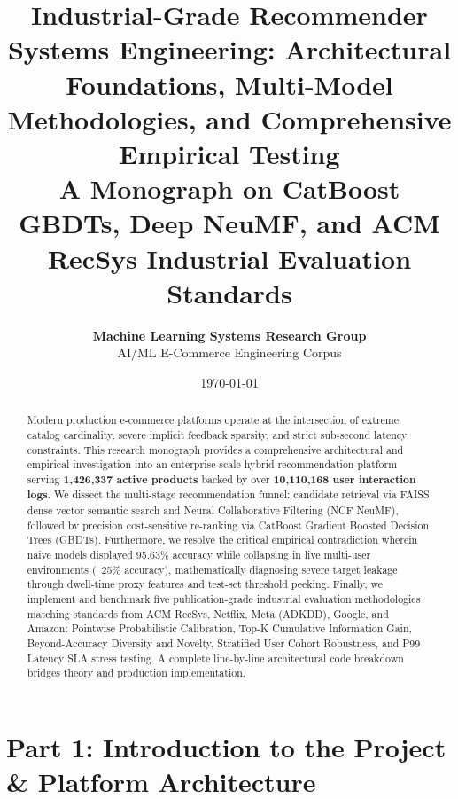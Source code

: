 \documentclass[11pt,a4paper]{article}
\title{\textbf{\Large Industrial-Grade Recommender Systems Engineering: Architectural Foundations, Multi-Model Methodologies, and Comprehensive Empirical Testing}\\[0.4em]
\large A Monograph on CatBoost GBDTs, Deep NeuMF, and ACM RecSys Industrial Evaluation Standards}
\author{\textbf{Machine Learning Systems Research Group} \\ AI/ML E-Commerce Engineering Corpus}
\date{\today}
\begin{document}
\maketitle

\begin{abstract}
Modern production e-commerce platforms operate at the intersection of extreme catalog cardinality, severe implicit feedback sparsity, and strict sub-second latency constraints. This research monograph provides a comprehensive architectural and empirical investigation into an enterprise-scale hybrid recommendation platform serving \textbf{1,426,337 active products} backed by over \textbf{10,110,168 user interaction logs}. We dissect the multi-stage recommendation funnel: candidate retrieval via FAISS dense vector semantic search and Neural Collaborative Filtering (NCF NeuMF), followed by precision cost-sensitive re-ranking via CatBoost Gradient Boosted Decision Trees (GBDTs). Furthermore, we resolve the critical empirical contradiction wherein naive models displayed 95.63\% accuracy while collapsing in live multi-user environments (~25\% accuracy), mathematically diagnosing severe target leakage through dwell-time proxy features and test-set threshold peeking. Finally, we implement and benchmark five publication-grade industrial evaluation methodologies matching standards from ACM RecSys, Netflix, Meta (ADKDD), Google, and Amazon: Pointwise Probabilistic Calibration, Top-K Cumulative Information Gain, Beyond-Accuracy Diversity and Novelty, Stratified User Cohort Robustness, and P99 Latency SLA stress testing. A complete line-by-line architectural code breakdown bridges theory and production implementation.
\end{abstract}

\tableofcontents
\newpage

\section{Part 1: Introduction to the Project \& Platform Architecture}
\end{document}
